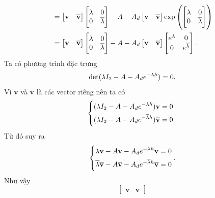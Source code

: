 \begin{cm}
\begin{align}
	&= 
	\begin{bmatrix}
		\mathbf{v}&\mathbf{\overline{v}}
	\end{bmatrix}
	\begin{bmatrix}
		\lambda & 0 \\ 0 & \overline{\lambda}
	\end{bmatrix}
	- A - A_d \begin{bmatrix}
		\mathbf{v}&\mathbf{\overline{v}}
	\end{bmatrix} \exp \left(\begin{bmatrix}
		\lambda & 0 \\ 0 & \overline{\lambda}
	\end{bmatrix}\right)\\ \notag
	&= \begin{bmatrix}
		\mathbf{v}&\mathbf{\overline{v}}
	\end{bmatrix}
	\begin{bmatrix}
		\lambda & 0 \\ 0 & \overline{\lambda}
	\end{bmatrix}
	- A - A_d \begin{bmatrix}
		\mathbf{v}&\mathbf{\overline{v}}
	\end{bmatrix} \begin{bmatrix}
		e^{\lambda} & 0 \\ 0 & e^{\overline{\lambda}}
	\end{bmatrix}.
\end{align} 
Ta có phương trình đặc trưng
\begin{equation*}
	\det(\lambda I_2 -A - A_de^{-\lambda h }) = 0 .
\end{equation*}
Vì $\mathbf{v}$ và  $\mathbf{\overline{v}}$ là các vector riêng nên ta có
\begin{equation*}
	\left\{\begin{aligned}
		&(\lambda I_2 -A - A_de^{-\lambda h })\mathbf{v} =0\\
		&(\overline{\lambda} I_2 -A - A_de^{-\overline{\lambda} h }) \mathbf{\overline{v}} =0\end{aligned}\right. .
\end{equation*}
Từ đó suy ra
\begin{equation*}
	\left\{\begin{aligned}
		&\lambda \mathbf{v} -A\mathbf{v} - A_de^{-\lambda h }\mathbf{v} =0\\
		&\overline{\lambda}\mathbf{\overline{v}} -A\mathbf{\overline{v}} - A_de^{-\overline{\lambda} h }\mathbf{\overline{v}} =0\end{aligned}\right. .
\end{equation*}
Như vậy
\begin{equation}\label{200}
	\begin{bmatrix}
		\mathbf{v}&\mathbf{\overline{v}}
	\end{bmatrix}

\end{equation}
\end{cm}
